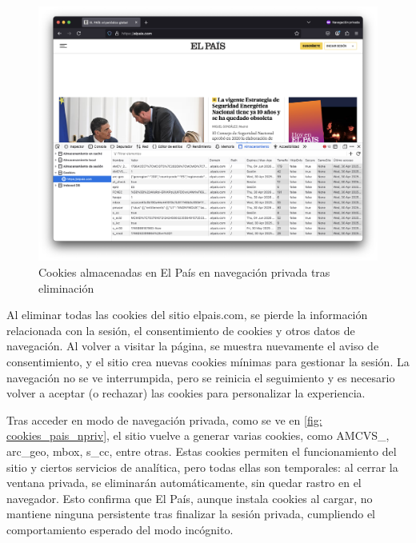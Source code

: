 \begin{figure}[H]   
    \includegraphics[width=15cm]{cookies_pais_npriv.png}
    \caption{Cookies almacenadas en El País en navegación privada tras eliminación}
    \label{fig:cookies_pais_npriv}
\end{figure}

Al eliminar todas las cookies del sitio elpais.com, se pierde la información relacionada con la sesión, el consentimiento de cookies y otros datos de navegación. Al volver a visitar la página, se muestra nuevamente el aviso de consentimiento, y el sitio crea nuevas cookies mínimas para gestionar la sesión. La navegación no se ve interrumpida, pero se reinicia el seguimiento y es necesario volver a aceptar (o rechazar) las cookies para personalizar la experiencia. 

Tras acceder en modo de navegación privada, como se ve en \ref{fig: cookies_pais_npriv}, el sitio vuelve a generar varias cookies, como AMCVS_, arc_geo, mbox, s_cc, entre otras. Estas cookies permiten el funcionamiento del sitio y ciertos servicios de analítica, pero todas ellas son temporales: al cerrar la ventana privada, se eliminarán automáticamente, sin quedar rastro en el navegador. Esto confirma que El País, aunque instala cookies al cargar, no mantiene ninguna persistente tras finalizar la sesión privada, cumpliendo el comportamiento esperado del modo incógnito. 